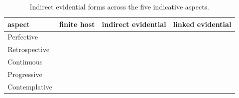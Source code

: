 \begin{table}[htbp]
\footnotesize
\caption{Indirect evidential forms across the five indicative aspects.}
\ifparadigmappendix\else\label{tab:inner-evidential-paradigm}\fi
\begin{tabularx}{\textwidth}{L L L L}
\toprule
{\sc aspect} & {\sc finite host} & {\sc indirect evidential} & {\sc linked evidential} \\
\midrule
Perfective &  &  &  \\
Retrospective &  &  &  \\
Continuous &  &  &  \\
Progressive &  &  &  \\
Contemplative &  &  &  \\
\bottomrule
\end{tabularx}
\end{table}
